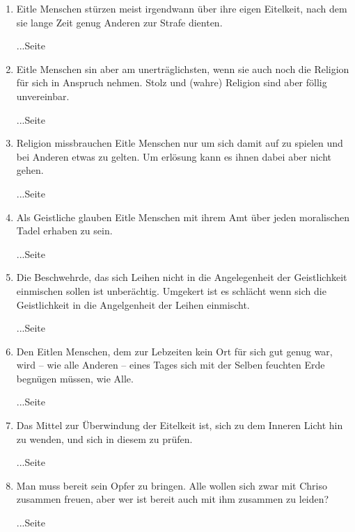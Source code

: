 \begin{enumerate}
\begin{enumerate}
 \item Eitle Menschen stürzen meist irgendwann über ihre eigen Eitelkeit, nach dem sie lange Zeit genug Anderen zur Strafe dienten. 
 \begin{flushright}...Seite \pageref{ref:12_06_eitle_menschen_sturz}\end{flushright}
 \item Eitle Menschen sin aber am unerträglichsten, wenn sie auch noch die Religion für sich in Anspruch nehmen. Stolz und (wahre) Religion sind aber föllig unvereinbar.
 \begin{flushright}...Seite \pageref{ref:12_07_eitle_menschen_religion}\end{flushright}
 \item Religion missbrauchen Eitle Menschen nur um sich damit auf zu spielen und bei Anderen etwas zu gelten. Um erlösung kann es ihnen dabei aber nicht gehen.
 \begin{flushright}...Seite \pageref{ref:12_07_eitle_menschen_religion_2}\end{flushright}
 \item Als Geistliche glauben Eitle Menschen mit ihrem Amt über jeden moralischen Tadel erhaben zu sein.
 \begin{flushright}...Seite \pageref{ref:12_07_eitle_menschen_geislicher}\end{flushright}
 \item Die Beschwehrde, das sich Leihen nicht in die Angelegenheit der Geistlichkeit einmischen sollen ist unberächtig. Umgekert ist es schlächt wenn sich die Geistlichkeit in die Angelgenheit der Leihen einmischt.
 \begin{flushright}...Seite \pageref{ref:12_08_eitle_menschen_leihen_vs_geisltichkeit}\end{flushright}
 \item Den Eitlen Menschen, dem zur Lebzeiten kein Ort für sich gut genug war, wird -- wie alle Anderen -- eines Tages sich mit der Selben feuchten Erde begnügen müssen, wie Alle. 
 \begin{flushright}...Seite \pageref{ref:12_10_eitle_menschen_tod}\end{flushright}
 \item Das Mittel zur Überwindung der Eitelkeit ist, sich zu dem Inneren Licht hin zu wenden, und sich in diesem zu prüfen.
 \begin{flushright}...Seite \pageref{ref:12_11_eitle_menschen_erloesung}\end{flushright}
 \item Man muss bereit sein Opfer zu bringen. Alle wollen sich zwar mit Chriso zusammen freuen, aber wer ist bereit auch mit ihm zusammen zu leiden?
 \begin{flushright}...Seite \pageref{ref:12_11_opfer}\end{flushright}
 \end{enumerate}


\end{enumerate}
